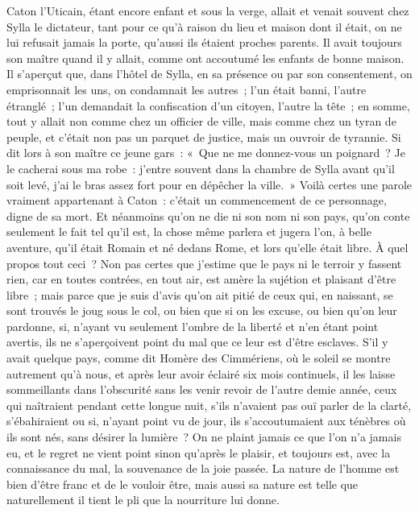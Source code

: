 \documentclass[french,twoside]{book} %
\begin{document}
Caton l’Uticain, étant encore enfant et sous la verge, allait et venait souvent chez Sylla le dictateur, tant pour ce qu’à raison du lieu et maison dont il était, on ne lui refusait jamais la porte, qu’aussi ils étaient proches parents. Il avait toujours son maître quand il y allait, comme ont accoutumé les enfants de bonne maison. Il s’aperçut que, dans l’hôtel de Sylla, en sa présence ou par son consentement, on emprisonnait les uns, on condamnait les autres ; l’un était banni, l’autre étranglé ; l’un demandait la confiscation d’un citoyen, l’autre la tête ; en somme, tout y allait non comme chez un officier de ville, mais comme chez un tyran de peuple, et c’était non pas un parquet de justice, mais un ouvroir de tyrannie. Si dit lors à son maître ce jeune gars : « Que ne me donnez-vous un poignard ? Je le cacherai sous ma robe : j’entre souvent dans la chambre de Sylla avant qu’il soit levé, j’ai le bras assez fort pour en dépêcher la ville. » Voilà certes une parole vraiment appartenant à Caton : c’était un commencement de ce personnage, digne de sa mort. Et néanmoins qu’on ne die ni son nom ni son pays, qu’on conte seulement le fait tel qu’il est, la chose même parlera et jugera l’on, à belle aventure, qu’il était Romain et né dedans Rome, et lors qu’elle était libre. À quel propos tout ceci ? Non pas certes que j’estime que le pays ni le terroir y fassent rien, car en toutes contrées, en tout air, est amère la sujétion et plaisant d’être libre ; mais parce que je suis d’avis qu’on ait pitié de ceux qui, en naissant, se sont trouvés le joug sous le col, ou bien que si on les excuse, ou bien qu’on leur pardonne, si, n’ayant vu seulement l’ombre de la liberté et n’en étant point avertis, ils ne s’aperçoivent point du mal que ce leur est d’être esclaves. S’il y avait quelque pays, comme dit Homère des Cimmériens, où le soleil se montre autrement qu’à nous, et après leur avoir éclairé six mois continuels, il les laisse sommeillants dans l’obscurité sans les venir revoir de l’autre demie année, ceux qui naîtraient pendant cette longue nuit, s’ils n’avaient pas ouï parler de la clarté, s’ébahiraient ou si, n’ayant point vu de jour, ils s’accoutumaient aux ténèbres où ils sont nés, sans désirer la lumière ? On ne plaint jamais ce que l’on n’a jamais eu, et le regret ne vient point sinon qu’après le plaisir, et toujours est, avec la connaissance du mal, la souvenance de la joie passée. La nature de l’homme est bien d’être franc et de le vouloir être, mais aussi sa nature est telle que naturellement il tient le pli que la nourriture lui donne.\par
\end{document}
